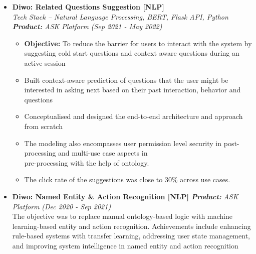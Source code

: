 \documentclass[a4paper,10pt]{article}
\newcommand{\isep}{-2 pt}
\begin{document}
\begin{itemize}
\item \textbf{Diwo: Related Questions Suggestion [NLP]}  \\
    \emph{Tech Stack -- Natural Language Processing, BERT, Flask API, Python
    \qquad \textbf{Product:} ASK Platform} \hfill {\emph{(Sep 2021 - May 2022)}}
    \\[-0.6cm]
    \begin{itemize}\itemsep \isep
    	\item \textbf{Objective:} To reduce the barrier for users to interact with the system by suggesting cold start questions and context aware questions during an active session 
        \item Built context-aware prediction of questions that the user might be interested in asking next based on their past interaction, behavior and questions
        \item Conceptualised and designed the end-to-end architecture and approach from scratch 
        \item The modeling also encompasses user permission level security in post-processing and multi-use case aspects in \\ pre-processing with the help of ontology. 
        \item The click rate of the suggestions was close to 30\% across use cases.
        \\ [-0.5cm]
    \end{itemize}

\item \textbf{Diwo: Named Entity \& Action Recognition [NLP] \qquad \emph{Product:}} \emph{ASK Platform} \hfill {\emph{(Dec 2020 - Sep 2021)}}\\The objective was to replace manual ontology-based logic with machine learning-based entity and action recognition. Achievements include enhancing rule-based systems with transfer learning, addressing user state management, and improving system intelligence in named entity and action recognition 
\\ [-0.5cm]


\end{itemize}
\end{document}
